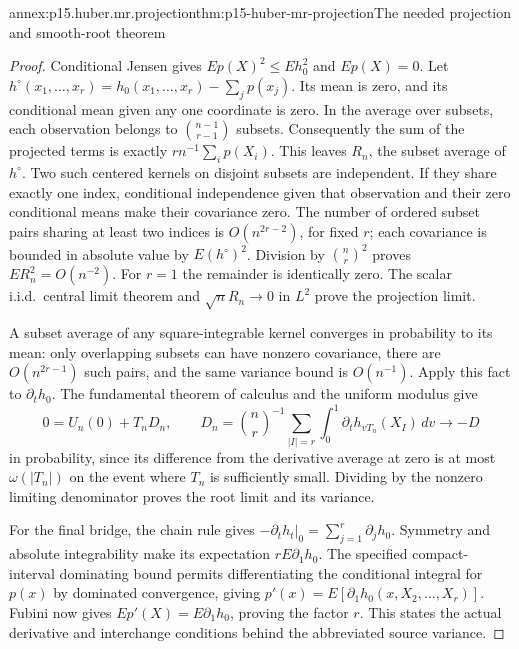 \begin{annexitem}{annex:p15.huber.mr.projection}{thm:p15-huber-mr-projection}{The needed projection and smooth-root theorem}
\begin{proof}
Conditional Jensen gives \(Ep(X)^2\leq Eh_0^2\) and \(Ep(X)=0\).
Let \(h^\circ(x_1,\ldots,x_r)=h_0(x_1,\ldots,x_r)-\sum_jp(x_j)\).
Its mean is zero, and its conditional mean given any one coordinate
is zero. In the average over subsets, each observation belongs to
\(\binom{n-1}{r-1}\) subsets. Consequently the sum of the projected
terms is exactly \(r n^{-1}\sum_i p(X_i)\).
This leaves \(R_n\), the subset average of \(h^\circ\).
Two such centered kernels on disjoint subsets are independent.
If they share exactly one index, conditional independence given
that observation and their zero conditional means make their
covariance zero. The number of ordered subset pairs sharing at
least two indices is \(O(n^{2r-2})\), for fixed \(r\);
each covariance is bounded in absolute value by \(E(h^\circ)^2\).
Division by \(\binom nr^2\) proves \(ER_n^2=O(n^{-2})\).
For \(r=1\) the remainder is identically zero.
The scalar i.i.d.\ central limit theorem and
\(\sqrt nR_n\to0\) in \(L^2\) prove the projection limit.

A subset average of any square-integrable kernel converges in
probability to its mean: only overlapping subsets can have
nonzero covariance, there are \(O(n^{2r-1})\) such pairs, and
the same variance bound is \(O(n^{-1})\).
Apply this fact to \(\partial_t h_0\).
The fundamental theorem of calculus and the uniform modulus
give
\[
 0=U_n(0)+T_nD_n,\qquad
 D_n=\binom nr^{-1}\sum_{|I|=r}
                 \int_0^1\partial_t h_{vT_n}(X_I)\,dv
       \longrightarrow -D
\]
in probability, since its difference from the derivative average
at zero is at most \(\omega(|T_n|)\) on the event where \(T_n\)
is sufficiently small. Dividing by the nonzero limiting denominator
proves the root limit and its variance.

For the final bridge, the chain rule gives
\(-\partial_t h_t|_0=\sum_{j=1}^r\partial_j h_0\).
Symmetry and absolute integrability make its expectation
\(rE\partial_1h_0\). The specified compact-interval dominating
bound permits differentiating the conditional integral for \(p(x)\)
by dominated convergence, giving
\(p'(x)=E[\partial_1h_0(x,X_2,\ldots,X_r)]\).
Fubini now gives \(Ep'(X)=E\partial_1h_0\), proving the factor \(r\).
This states the actual derivative and interchange conditions behind
the abbreviated source variance.
\end{proof}
\end{annexitem}

